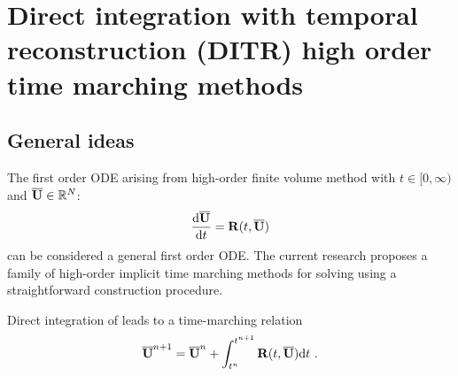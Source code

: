 

\section{Direct integration with temporal reconstruction (DITR)
  high order time marching methods}
\label{sec:HIRK}

\subsection{General ideas}

The first order ODE  arising
from high-order finite volume method
with
$t\in[0,\infty)$ and $\overline{\mathbf{U}}\in \mathbb{R}^N$:
\begin{equation*}
    \frac{\dd \overline{\mathbf{U}}}{\dd t} = \mathbf{R}(t, \overline{\mathbf{U}})
\end{equation*}
can be considered a general first order ODE.
The current research proposes a family of high-order implicit time marching
methods for solving 
using a straightforward construction procedure.

Direct integration of 
leads to a time-marching relation
\begin{equation}
    \overline{\mathbf{U}}^{n+1} = \overline{\mathbf{U}}^{n} + \int_{t^n}^{t^{n+1}}{
    \mathbf{R}(t, \overline{\mathbf{U}}) \dd t
    }\ .
    \label{eq:DI}
\end{equation}

